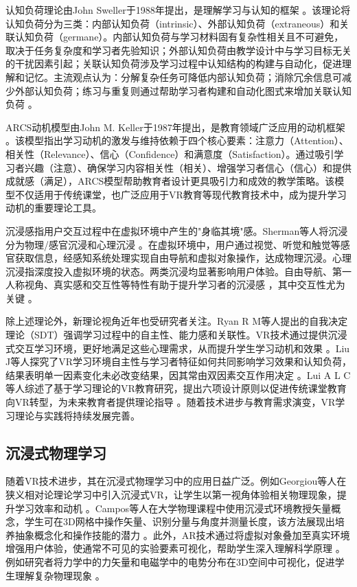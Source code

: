 \documentclass[runningheads]{llncs}
\begin{document}
认知负荷理论由John Sweller于1988年提出，是理解学习与认知的框架 \cite{sweller1988cognitive}。该理论将认知负荷分为三类：内部认知负荷（intrinsic）、外部认知负荷（extraneous）和关联认知负荷（germane）。内部认知负荷与学习材料固有复杂性相关且不可避免，取决于任务复杂度和学习者先验知识；外部认知负荷由教学设计中与学习目标无关的干扰因素引起；关联认知负荷涉及学习过程中认知结构的构建与自动化，促进理解和记忆。主流观点认为：分解复杂任务可降低内部认知负荷；消除冗余信息可减少外部认知负荷；练习与重复则通过帮助学习者构建和自动化图式来增加关联认知负荷 \cite{baceviciute2022investigating}。

ARCS动机模型由John M. Keller于1987年提出，是教育领域广泛应用的动机框架 \cite{keller1987development}。该模型指出学习动机的激发与维持依赖于四个核心要素：注意力（Attention）、相关性（Relevance）、信心（Confidence）和满意度（Satisfaction）。通过吸引学习者兴趣（注意）、确保学习内容相关性（相关）、增强学习者信心（信心）和提供成就感（满足），ARCS模型帮助教育者设计更具吸引力和成效的教学策略。该模型不仅适用于传统课堂，也广泛应用于VR教育等现代教育技术中，成为提升学习动机的重要理论工具。

沉浸感指用户交互过程中在虚拟环境中产生的"身临其境"感。Sherman等人将沉浸分为物理/感官沉浸和心理沉浸 \cite{sherman2003understanding}。在虚拟环境中，用户通过视觉、听觉和触觉等感官获取信息，经感知系统处理实现自由导航和虚拟对象操作，达成物理沉浸。心理沉浸指深度投入虚拟环境的状态。两类沉浸均显著影响用户体验。自由导航、第一人称视角、真实感和交互性等特性有助于提升学习者的沉浸感 \cite{regenbrecht2002real,mikropoulos2006presence}，其中交互性尤为关键 \cite{schubert2001experience}。

除上述理论外，新理论视角近年也受研究者关注。Ryan R M等人提出的自我决定理论（SDT）强调学习过程中的自主性、能力感和关联性。VR技术通过提供沉浸式交互学习环境，更好地满足这些心理需求，从而提升学生学习动机和效果 \cite{ryan2024self}。Liu J等人探究了VR学习环境自主性与学习者特征如何共同影响学习效果和认知负荷，结果表明单一因素变化未必改变结果，因其常由双因素交互作用决定 \cite{liu2024autonomy}。Lui A L C等人综述了基于学习理论的VR教育研究，提出六项设计原则以促进传统课堂教育向VR转型，为未来教育者提供理论指导 \cite{lui2023theory}。随着技术进步与教育需求演变，VR学习理论与实践将持续发展完善。

\subsection{沉浸式物理学习}
随着VR技术进步，其在沉浸式物理学习中的应用日益广泛。例如Georgiou等人在狭义相对论理论学习中引入沉浸式VR，让学生以第一视角体验相关物理现象，提升学习效率和动机 \cite{georgiou2021learning}。Campos等人在大学物理课程中使用沉浸式环境教授矢量概念，学生可在3D网格中操作矢量、识别分量与角度并测量长度，该方法展现出培养抽象概念化和操作技能的潜力 \cite{campos2022impact}。此外，AR技术通过将虚拟对象叠加至真实环境增强用户体验，使通常不可见的实验要素可视化，帮助学生深入理解科学原理 \cite{pegrum2021augmented,prahani2022trend}。例如研究者将力学中的力矢量和电磁学中的电势分布在3D空间中可视化，促进学生理解复杂物理现象 \cite{al2020effectiveness,teichrew2020augmented,ismail2019enhancing,boettcher2021using}。
\end{document}
